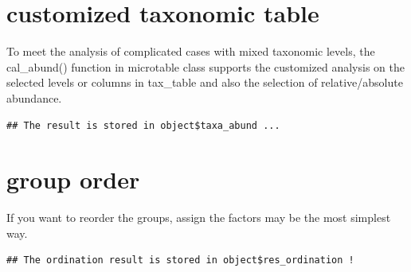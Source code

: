 \documentclass[
]{book}
\newenvironment{Shaded}{\begin{snugshade}}{\end{snugshade}}
\newcommand{\AttributeTok}[1]{\textcolor[rgb]{0.77,0.63,0.00}{#1}}
\newcommand{\CommentTok}[1]{\textcolor[rgb]{0.56,0.35,0.01}{\textit{#1}}}
\newcommand{\ConstantTok}[1]{\textcolor[rgb]{0.00,0.00,0.00}{#1}}
\newcommand{\DecValTok}[1]{\textcolor[rgb]{0.00,0.00,0.81}{#1}}
\newcommand{\FunctionTok}[1]{\textcolor[rgb]{0.00,0.00,0.00}{#1}}
\newcommand{\NormalTok}[1]{#1}
\newcommand{\OtherTok}[1]{\textcolor[rgb]{0.56,0.35,0.01}{#1}}
\newcommand{\SpecialCharTok}[1]{\textcolor[rgb]{0.00,0.00,0.00}{#1}}
\newcommand{\StringTok}[1]{\textcolor[rgb]{0.31,0.60,0.02}{#1}}
\begin{document}
\hypertarget{customized-taxonomic-table}{%
\section{customized taxonomic table}\label{customized-taxonomic-table}}

To meet the analysis of complicated cases with mixed taxonomic levels,
the cal\_abund() function in microtable class supports the customized analysis on the selected levels or columns in tax\_table and also
the selection of relative/absolute abundance.

\begin{Shaded}
\end{Shaded}

\begin{verbatim}
## The result is stored in object$taxa_abund ...
\end{verbatim}

\hypertarget{group-order}{%
\section{group order}\label{group-order}}

If you want to reorder the groups, assign the factors may be the most simplest way.

\begin{Shaded}
\end{Shaded}

\begin{verbatim}
## The ordination result is stored in object$res_ordination !
\end{verbatim}
\end{document}
